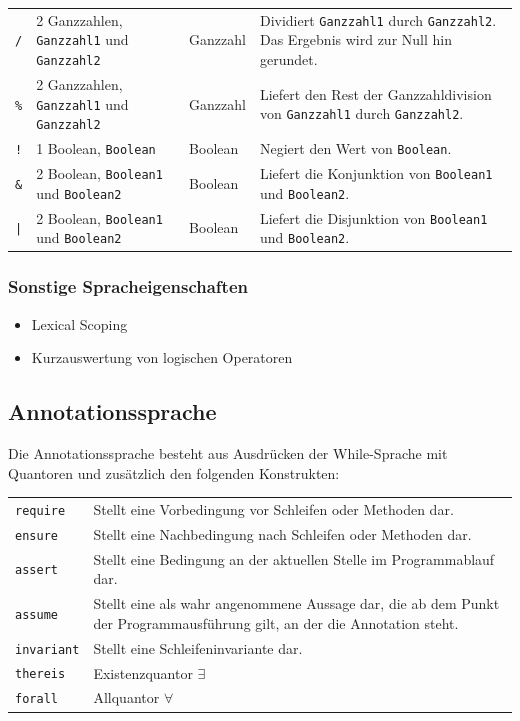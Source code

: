 \documentclass[a4paper,10pt]{article}
\begin{document}
\begin{tabularx}{\textwidth}{| l | X | l | X |}
\texttt{/} & 2 Ganzzahlen, \texttt{Ganzzahl1} und \texttt{Ganzzahl2} & Ganzzahl & Dividiert \texttt{Ganzzahl1} durch \texttt{Ganzzahl2}. Das Ergebnis wird zur Null hin gerundet.\\
\texttt{\%} & 2 Ganzzahlen, \texttt{Ganzzahl1} und \texttt{Ganzzahl2} & Ganzzahl & Liefert den Rest der Ganzzahldivision von \texttt{Ganzzahl1} durch \texttt{Ganzzahl2}.\\
\hline
\texttt{!} & 1 Boolean, \texttt{Boolean} & Boolean & Negiert den Wert von \texttt{Boolean}.\\
\texttt{\&} & 2 Boolean, \texttt{Boolean1} und \texttt{Boolean2} & Boolean & Liefert die Konjunktion von \texttt{Boolean1} und \texttt{Boolean2}.\\
\texttt{|} & 2 Boolean, \texttt{Boolean1} und \texttt{Boolean2} & Boolean & Liefert die Disjunktion von \texttt{Boolean1} und \texttt{Boolean2}.\\
\hline
\end{tabularx}
\subsubsection{Sonstige Spracheigenschaften}
\begin{itemize}
  \item Lexical Scoping
  \item Kurzauswertung von logischen Operatoren
\end{itemize}

\subsection{Annotationssprache}
Die Annotationssprache besteht aus Ausdr\"{u}cken der While-Sprache mit Quantoren und zus\"{a}tzlich den folgenden Konstrukten:\\[0.25cm]
\begin{tabularx}{\textwidth}{| l | X |}
\hline
\texttt{require} & Stellt eine Vorbedingung vor Schleifen oder Methoden dar.\\
\texttt{ensure} & Stellt eine Nachbedingung nach Schleifen oder Methoden dar.\\
\texttt{assert} & Stellt eine Bedingung an der aktuellen Stelle im Programmablauf dar.\\
\texttt{assume} & Stellt eine als wahr angenommene Aussage dar, die ab dem Punkt der Programmausf\"{u}hrung gilt, an der die Annotation steht.\\
\texttt{invariant} & Stellt eine Schleifeninvariante dar.\\
\hline
\texttt{thereis} & Existenzquantor $\exists$\\
\texttt{forall} & Allquantor $\forall$\\
\hline
\end{tabularx}
\end{document}
